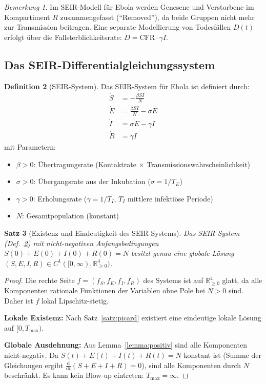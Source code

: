 ﻿\documentclass[12pt,a4paper]{article}
\theoremstyle{definition}
\newtheorem{definition}{Definition}[section]
\theoremstyle{plain}
\newtheorem{satz}[definition]{Satz}
\theoremstyle{remark}
\newtheorem{bemerkung}[definition]{Bemerkung}
\newcommand{\RRR}{\mathbb{R}}
\newcommand{\dd}{\mathrm{d}}
\begin{document}
\begin{bemerkung}
Im SEIR-Modell für Ebola werden Genesene und Verstorbene im Kompartiment $R$
zusammengefasst (``Removed''), da beide Gruppen nicht mehr zur Transmission beitragen.
Eine separate Modellierung von Todesfällen $D(t)$ erfolgt über die Fallsterblichkeitsrate:
$\dot{D} = \text{CFR} \cdot \gamma I$.
\end{bemerkung}

\subsection{Das SEIR-Differentialgleichungssystem}

\begin{definition}[SEIR-System]
\label{def:seir}
Das SEIR-System für Ebola ist definiert durch:
\begin{align}
  \dot{S} &= -\frac{\beta S I}{N} \label{eq:S} \\
  \dot{E} &= \frac{\beta S I}{N} - \sigma E \label{eq:E} \\
  \dot{I} &= \sigma E - \gamma I \label{eq:I} \\
  \dot{R} &= \gamma I \label{eq:R}
\end{align}
mit Parametern:
\begin{itemize}
  \item $\beta > 0$: Übertragungsrate (Kontaktrate $\times$ Transmissionswahrscheinlichkeit)
  \item $\sigma > 0$: Übergangsrate aus der Inkubation ($\sigma = 1/T_E$)
  \item $\gamma > 0$: Erholungsrate ($\gamma = 1/T_I$, $T_I$ mittlere infektiöse Periode)
  \item $N$: Gesamtpopulation (konstant)
\end{itemize}
\end{definition}

\begin{satz}[Existenz und Eindeutigkeit des SEIR-Systems]
\label{satz:existenz}
Das SEIR-System (Def.~\ref{def:seir}) mit nicht-negativen Anfangsbedingungen
$S(0)+E(0)+I(0)+R(0) = N$
besitzt genau eine globale Lösung $(S,E,I,R) \in C^1([0,\infty), \RRR^4_{\geq 0})$.
\end{satz}

\begin{proof}
Die rechte Seite $f = (f_S, f_E, f_I, f_R)$ des Systems ist auf $\RRR^4_{\geq 0}$
glatt, da alle Komponenten rationale Funktionen der Variablen ohne Pole bei $N > 0$ sind.
Daher ist $f$ lokal Lipschitz-stetig.

\textbf{Lokale Existenz:} Nach Satz~\ref{satz:picard} existiert eine eindeutige
lokale Lösung auf $[0, T_{\max})$.

\textbf{Globale Ausdehnung:} Aus Lemma~\ref{lemma:positiv} sind alle
Komponenten nicht-negativ. Da $S(t) + E(t) + I(t) + R(t) = N$ konstant ist
(Summe der Gleichungen ergibt $\frac{\dd}{\dd t}(S+E+I+R) = 0$), sind alle
Komponenten durch $N$ beschränkt. Es kann kein Blow-up eintreten: $T_{\max} = \infty$.
\end{proof}
\end{document}
